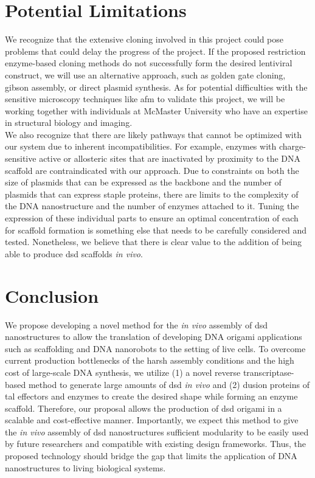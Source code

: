 \documentclass[a4paper]{article}
\begin{document}
\section*{Potential Limitations}
We recognize that the extensive cloning involved in this project could pose problems that could delay the progress of the project.
If the proposed restriction enzyme-based cloning methods do not successfully form the desired lentiviral construct, we will use an alternative approach, such as golden gate cloning, gibson assembly, or direct plasmid synthesis.
As for potential difficulties with the sensitive microscopy techniques like \ac{afm} to validate this project, we will be working together with individuals at McMaster University who have an expertise in structural biology and imaging.
\vspace{2 mm}
\\
We also recognize that there are likely pathways that cannot be optimized with our system due to inherent incompatibilities.
For example, enzymes with charge-sensitive active or allosteric sites that are inactivated by proximity to the DNA scaffold are contraindicated with our approach\cite{meth7}.
Due  to constraints on both the size of plasmids that can be expressed as the backbone and the number of plasmids that can express staple proteins, there are limits to the complexity of the DNA nanostructure and the number of enzymes attached to it.
Tuning the expression of these individual parts to ensure an optimal concentration of each for scaffold formation is something else that needs to be carefully considered and tested.
Nonetheless, we believe that there is clear value to the addition of being able to produce \ac{dsd} scaffolds \textit{in vivo}.

\section*{Conclusion}
We propose developing a novel method for the \textit{in vivo} assembly of \ac{dsd} nanostructures to allow the translation of developing DNA origami applications such as scaffolding and DNA nanorobots to the setting of live cells.
To overcome current production bottlenecks of the harsh assembly conditions and the high cost of large-scale DNA synthesis, we utilize (1) a novel reverse transcriptase-based method to generate large amounts of \ac{dsd} \textit{in vivo} and (2) dusion proteins of \ac{tal} effectors and enzymes to create the desired shape while forming an enzyme scaffold.
Therefore, our proposal allows the production of \ac{dsd} origami in a scalable and cost-effective manner.
Importantly, we expect this method to give the \textit{in vivo} assembly of \ac{dsd} nanostructures sufficient modularity to be easily used by future researchers and compatible with existing design frameworks.
Thus, the proposed technology should bridge the gap that limits the application of DNA nanostructures to living biological systems.


\end{document}
